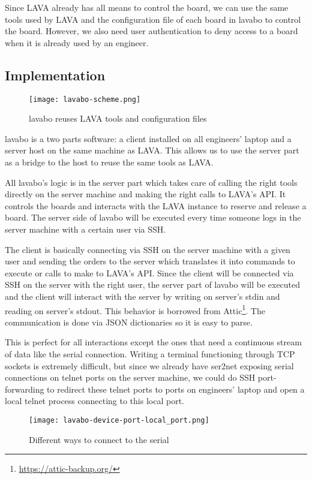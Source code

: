 Since LAVA already has all means to control the board, we can use the same tools used by LAVA and the configuration file of each board in lavabo to control the board. However, we also need user authentication to deny access to a board when it is already used by an engineer.

\subsection{Implementation}

\begin{figure}[H]
  \texttt{[image: lavabo-scheme.png]}
  \caption{lavabo reuses LAVA tools and configuration files}
\end{figure}

lavabo is a two parts software: a client installed on all engineers' laptop and a server host on the same machine as LAVA. This allows us to use the server part as a bridge to the host to reuse the same tools as LAVA.

All lavabo's logic is in the server part which takes care of calling the right tools directly on the server machine and making the right calls to LAVA's API. It controls the boards and interacts with the LAVA instance to reserve and release a board. The server side of lavabo will be executed every time someone logs in the server machine with a certain user via SSH.

The client is basically connecting via SSH on the server machine with a given user and sending the orders to the server which translates it into commands to execute or calls to make to LAVA's API. Since the client will be connected via SSH on the server with the right user, the server part of lavabo will be executed and the client will interact with the server by writing on server's stdin and reading on server's stdout. This behavior is borrowed from Attic\footnote{\url{https://attic-backup.org/}}. The communication is done via JSON dictionaries so it is easy to parse.

This is perfect for all interactions except the ones that need a continuous stream of data like the serial connection. Writing a terminal functioning through TCP sockets is extremely difficult, but since we already have ser2net exposing serial connections on telnet ports on the server machine, we could do SSH port-forwarding to redirect these telnet ports to ports on engineers' laptop and open a local telnet process connecting to this local port.

\begin{figure}[H]
  \texttt{[image: lavabo-device-port-local\_port.png]}
  \caption{Different ways to connect to the serial}
\end{figure}

